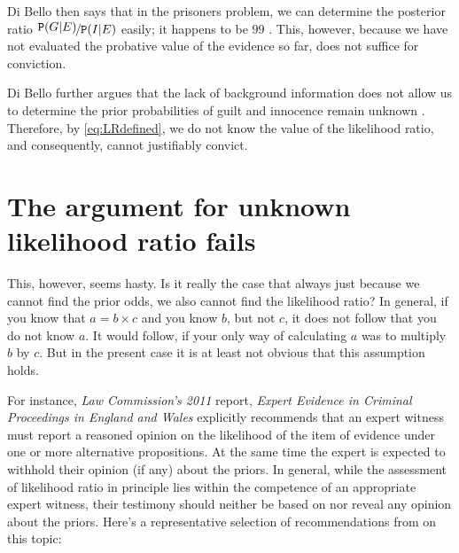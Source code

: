 \documentclass{article}
\newcommand{\pr}[1]{\mbox{$\mathtt{P}(#1)$}}
\begin{document}
\noindent Di Bello then says that in the prisoners problem, we can determine the posterior ratio $\nicefrac{\pr{G\vert E}}{\pr{I\vert E}}$ easily; it happens to be $99$ \citep[7]{dibello2019TrialStatisticsHigh}. This, however, because we have not evaluated the probative value of the evidence so far, does not suffice for conviction.

Di Bello further argues that the lack of background information does not allow us to determine the prior probabilities of guilt and innocence remain unknown \citep[7]{dibello2019TrialStatisticsHigh}.  Therefore, by \eqref{eq:LRdefined}, we do not know the value of the likelihood ratio, and consequently, cannot justifiably convict.  



 \section{The argument for unknown likelihood ratio fails} \label{sec:unknown_fails}

 This, however, seems hasty. Is it really the case that always just because we cannot find the prior odds, we also cannot find the likelihood ratio? In general, if you know that $a=b\times c$ and you know $b$, but  not  $c$, it does not follow that you do not know  $a$. It would follow, if your only way of calculating $a$ was to multiply $b$ by $c$. But in the present case it is at least not obvious that this assumption holds. 


For instance,  \emph{Law Commission’s 2011} report, \emph{Expert Evidence in Criminal Proceedings in England and Wales} explicitly recommends that  an expert witness  must report a reasoned opinion on the likelihood of the item of evidence under one or more alternative propositions. At the same time the expert is expected to withhold their opinion (if any) about the priors. In general, while the assessment of likelihood ratio in principle lies within the competence of an appropriate expert witness, their testimony should neither be based on nor reveal any opinion about the priors. Here's a representative selection of recommendations from \citep{aitken2010fundamentals} on this topic:
\end{document}
